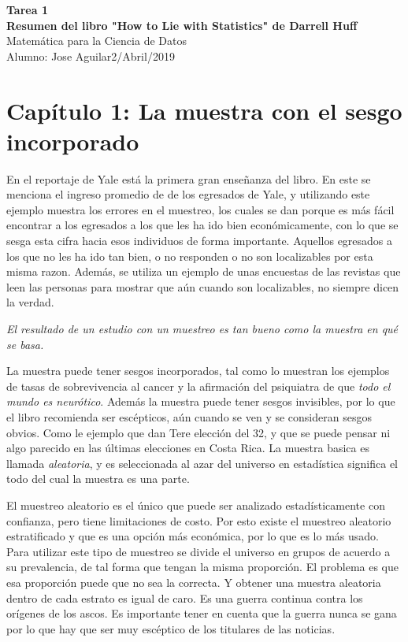 \documentclass[letterpaper, 11pt]{article}
\begin{document}
\linespread{1.5}
\noindent
\large\textbf{Tarea 1} \\
\textbf{Resumen del libro "How to Lie with Statistics" de Darrell Huff} \\
\normalsize Matemática para la Ciencia de Datos \\
Alumno: Jose Aguilar\hfill 2/Abril/2019 \\


\section*{Capítulo 1: La muestra con el sesgo incorporado}

En el reportaje de Yale está la primera gran enseñanza del libro. En este se menciona el ingreso promedio de  de los egresados de Yale, y utilizando este ejemplo muestra los errores en el muestreo, los cuales se dan porque es más fácil encontrar a los egresados a los que les ha ido bien económicamente, con lo que se sesga esta cifra hacia esos individuos de forma importante. Aquellos egresados a los que no les ha ido tan bien, o no responden o no son localizables por esta misma razon. Además, se utiliza un ejemplo de unas encuestas de las revistas que leen las personas para mostrar que aún cuando son localizables, no siempre dicen la verdad.

\textit{El resultado de un estudio con un muestreo es tan bueno como la muestra en qué se basa.}

La muestra puede tener sesgos incorporados, tal como lo muestran los ejemplos de tasas de sobrevivencia al cancer y la afirmación del psiquiatra de que \textit{todo el mundo es neurótico}. Además la muestra puede tener sesgos invisibles, por lo que el libro recomienda ser escépticos, aún cuando se ven y se consideran sesgos obvios. Como le ejemplo que dan Tere elección del 32, y que se puede pensar ni algo parecido en las últimas elecciones en Costa Rica. La muestra basica es llamada \textit{aleatoria}, y es seleccionada al azar del universo en estadística significa el todo del cual la muestra es una parte.

El muestreo aleatorio es el único que puede ser analizado estadísticamente con confianza, pero tiene limitaciones de costo. Por esto existe el muestreo aleatorio estratificado y que es una opción más económica, por lo que es lo más usado.  Para utilizar este tipo de muestreo se divide el universo en grupos de acuerdo a su prevalencia, de tal forma que tengan la misma proporción. El problema es que esa proporción puede que no sea la correcta. Y obtener una muestra aleatoria dentro de cada estrato es igual de caro. Es una guerra continua contra los orígenes de los ascos. Es importante tener en cuenta que la guerra nunca se gana por lo que hay que ser muy escéptico de los titulares de las noticias.
 
\end{document}
